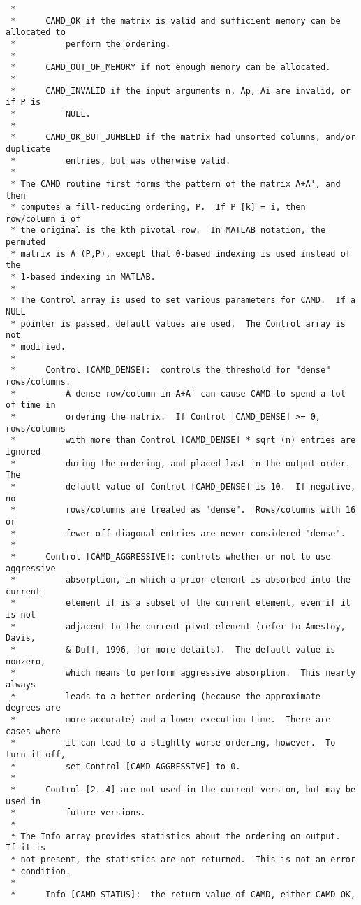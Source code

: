 \documentclass[11pt]{article}
\begin{document}
{\begin{verbatim}
 *
 *      CAMD_OK if the matrix is valid and sufficient memory can be allocated to
 *          perform the ordering.
 *
 *      CAMD_OUT_OF_MEMORY if not enough memory can be allocated.
 *
 *      CAMD_INVALID if the input arguments n, Ap, Ai are invalid, or if P is
 *          NULL.
 *
 *      CAMD_OK_BUT_JUMBLED if the matrix had unsorted columns, and/or duplicate
 *          entries, but was otherwise valid.
 *
 * The CAMD routine first forms the pattern of the matrix A+A', and then
 * computes a fill-reducing ordering, P.  If P [k] = i, then row/column i of
 * the original is the kth pivotal row.  In MATLAB notation, the permuted
 * matrix is A (P,P), except that 0-based indexing is used instead of the
 * 1-based indexing in MATLAB.
 *
 * The Control array is used to set various parameters for CAMD.  If a NULL
 * pointer is passed, default values are used.  The Control array is not
 * modified.
 *
 *      Control [CAMD_DENSE]:  controls the threshold for "dense" rows/columns.
 *          A dense row/column in A+A' can cause CAMD to spend a lot of time in
 *          ordering the matrix.  If Control [CAMD_DENSE] >= 0, rows/columns
 *          with more than Control [CAMD_DENSE] * sqrt (n) entries are ignored
 *          during the ordering, and placed last in the output order.  The
 *          default value of Control [CAMD_DENSE] is 10.  If negative, no
 *          rows/columns are treated as "dense".  Rows/columns with 16 or
 *          fewer off-diagonal entries are never considered "dense".
 *
 *      Control [CAMD_AGGRESSIVE]: controls whether or not to use aggressive
 *          absorption, in which a prior element is absorbed into the current
 *          element if is a subset of the current element, even if it is not
 *          adjacent to the current pivot element (refer to Amestoy, Davis,
 *          & Duff, 1996, for more details).  The default value is nonzero,
 *          which means to perform aggressive absorption.  This nearly always
 *          leads to a better ordering (because the approximate degrees are
 *          more accurate) and a lower execution time.  There are cases where
 *          it can lead to a slightly worse ordering, however.  To turn it off,
 *          set Control [CAMD_AGGRESSIVE] to 0.
 *
 *      Control [2..4] are not used in the current version, but may be used in
 *          future versions.
 *
 * The Info array provides statistics about the ordering on output.  If it is
 * not present, the statistics are not returned.  This is not an error
 * condition.
 * 
 *      Info [CAMD_STATUS]:  the return value of CAMD, either CAMD_OK,

\end{verbatim}}
\end{document}
